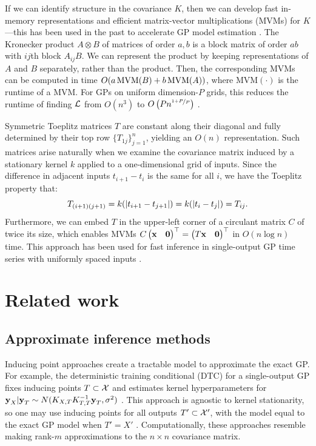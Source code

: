 \documentclass{article}
\begin{document}
If we can identify structure in the covariance $K$, then we can develop fast in-memory representations and efficient matrix-vector multiplications (MVMs) for $K$---this has been used in the past to accelerate GP model estimation \cite{gilboa2015scaling, cunningham2008fast}. The Kronecker product $A\otimes B$ of matrices of order $a,b$ is a block matrix of order $ab$ with $ij$th block $A_{ij}B$. We can represent the product by keeping representations of $A$ and $B$ separately, rather than the product. Then, the corresponding MVMs can be computed in time $O(a\operatorname{MVM}(B)+b\operatorname{MVM}(A))$, where $\text{MVM}(\cdot)$ is the runtime of a MVM. For GPs on uniform dimension-$P$ grids, this reduces the runtime of finding $\mathcal{L}$ from $O(n^3)$ to $O\left({Pn^{\nicefrac{1+P}{P}}}\right)$ \cite{gilboa2015scaling}.

Symmetric Toeplitz matrices $T$ are constant along their diagonal and fully determined by their top row $\{T_{1j}\}_{j=1}^n$, yielding an $O(n)$ representation. Such matrices arise naturally when we examine the covariance matrix induced by a stationary kernel $k$ applied to a one-dimensional grid of inputs. Since the difference in adjacent inputs $t_{i+1}-t_{i}$ is the same for all $i$, we have the Toeplitz property that:
\[
T_{(i+1)(j+1)}=k(\left|t_{i+1} -t_{j+1}\right|)=k(\left|t_i-t_j\right|)=T_{ij}.
\]
Furthermore, we can embed $T$ in the upper-left corner of a circulant matrix $C$ of twice its size, which enables MVMs $C\begin{pmatrix} \textbf{x} & \textbf{0} \end{pmatrix}^\top=\begin{pmatrix} T\textbf{x} &\textbf{0} \end{pmatrix}^\top$ in $O(n\log n)$ time. This approach has been used for fast inference in single-output GP time series with uniformly spaced inputs \cite{cunningham2008fast}.

\section{Related work}
\label{sec:related-work}
\subsection{Approximate inference methods}

Inducing point approaches create a tractable model to approximate the exact GP. For example, the deterministic training conditional (DTC) for a single-output GP fixes inducing points $T\subset\mathcal{X}$ and estimates kernel hyperparameters for $\textbf{y}_{X}|\textbf{y}_{T}\sim N(K_{X,T}K_{T,T}^{-1}\textbf{y}_T,\sigma^2)$ \cite{quinonero2005unifying}. This approach is agnostic to kernel stationarity, so one may use inducing points for all outputs $T'\subset \mathcal{X}'$, with the model equal to the exact GP model when $T'={X'}$ \cite{alvarez2010efficient}. Computationally, these approaches resemble making rank-$m$ approximations to the $n\times n$ covariance matrix.
\end{document}
